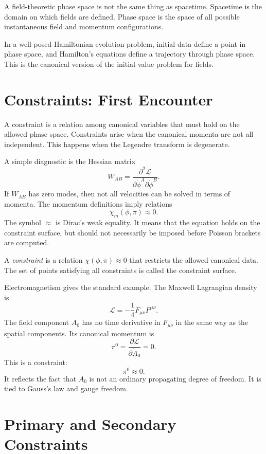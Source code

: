 \begin{remarkbox}
A field-theoretic phase space is not the same thing as spacetime. Spacetime is
the domain on which fields are defined. Phase space is the space of all possible
instantaneous field and momentum configurations.
\end{remarkbox}

In a well-posed Hamiltonian evolution problem, initial data define a point in
phase space, and Hamilton's equations define a trajectory through phase space.
This is the canonical version of the initial-value problem for fields.

\section{Constraints: First Encounter}

A constraint is a relation among canonical variables that must hold on the
allowed phase space. Constraints arise when the canonical momenta are not all
independent. This happens when the Legendre transform is degenerate.

A simple diagnostic is the Hessian matrix
\[
    W_{AB}
    =\frac{\partial^2\mathcal{L}}
    {\partial\dot\phi^A\partial\dot\phi^B}.
\]
If \(W_{AB}\) has zero modes, then not all velocities can be solved in terms of
momenta. The momentum definitions imply relations
\[
    \chi_m(\phi,\pi)\approx 0.
\]
The symbol \(\approx\) is Dirac's weak equality. It means that the equation holds
on the constraint surface, but should not necessarily be imposed before Poisson
brackets are computed.

\begin{definitionbox}
A \emph{constraint} is a relation \(\chi(\phi,\pi)\approx 0\) that restricts the
allowed canonical data. The set of points satisfying all constraints is called
the constraint surface.
\end{definitionbox}

Electromagnetism gives the standard example. The Maxwell Lagrangian density is
\[
    \mathcal{L}=-\frac{1}{4}F_{\mu\nu}F^{\mu\nu}.
\]
The field component \(A_0\) has no time derivative in \(F_{\mu\nu}\) in the same
way as the spatial components. Its canonical momentum is
\[
    \pi^0=\frac{\partial\mathcal{L}}{\partial\dot A_0}=0.
\]
This is a constraint:
\[
    \pi^0\approx 0.
\]
It reflects the fact that \(A_0\) is not an ordinary propagating degree of
freedom. It is tied to Gauss's law and gauge freedom.

\section{Primary and Secondary Constraints}

